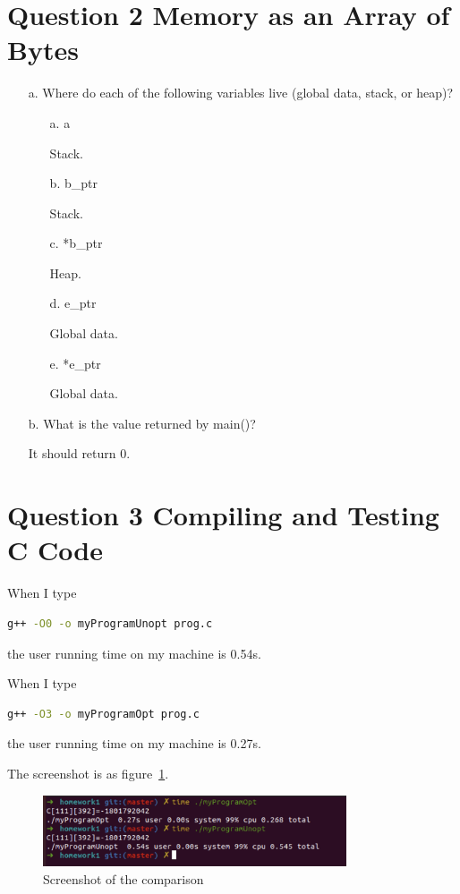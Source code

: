 \documentclass{article}
\theoremstyle{remark}
\theoremstyle{definition}
\begin{document}
    \section{Question 2 Memory as an Array of Bytes}
    \begin{enumerate}
        \item[a. ]
        Where do each of the following variables live (global data, stack, or heap)?
        \begin{enumerate}
            \item[a. ] a

            Stack.
            \item[b. ] b\_ptr

            Stack.
            \item[c. ] *b\_ptr

            Heap.
            \item[d. ] e\_ptr

            Global data.
            \item[e. ] *e\_ptr

            Global data.
        \end{enumerate}
        \item[b. ] What is the value returned by main()?

        It should return 0.
    \end{enumerate}


    \section{Question 3 Compiling and Testing C Code}
    When I type
    \begin{lstlisting}[language=bash]
        g++ -O0 -o myProgramUnopt prog.c
    \end{lstlisting}
    the user running time on my machine is 0.54s.

    When I type
    \begin{lstlisting}[language=bash]
        g++ -O3 -o myProgramOpt prog.c
    \end{lstlisting}
    the user running time on my machine is 0.27s.

    The screenshot is as figure~\ref{fig:optUnoptCompare}.
    \begin{figure}[!htbp]
        \centering
        \includegraphics[width=0.8\textwidth]{img/optUnoptCompare.png}
        \caption{Screenshot of the comparison}
        \label{fig:optUnoptCompare}
    \end{figure}
\end{document}
